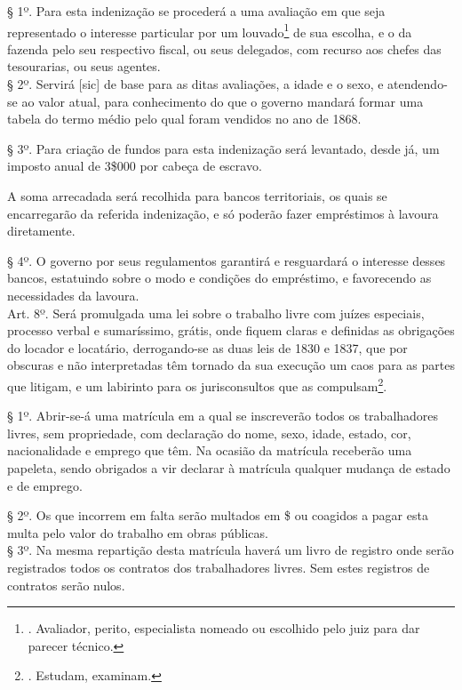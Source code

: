 § 1º. Para esta indenização se procederá a uma avaliação em que seja
representado o interesse particular por um louvado\footnote{. Avaliador,
  perito, especialista nomeado ou escolhido pelo juiz para dar parecer
  técnico.} de sua escolha, e o da fazenda pelo seu respectivo fiscal,
ou seus delegados, com recurso aos chefes das tesourarias, ou seus
agentes.\\
§ 2º. Servirá {[}sic{]} de base para as ditas avaliações, a idade e o
sexo, e atendendo-se ao valor atual, para conhecimento do que o governo
mandará formar uma tabela do termo médio pelo qual foram vendidos no ano
de 1868.

§ 3º. Para criação de fundos para esta indenização será levantado, desde
já, um imposto anual de 3\$000 por cabeça de escravo.

A soma arrecadada será recolhida para bancos territoriais, os quais se
encarregarão da referida indenização, e só poderão fazer empréstimos à
lavoura diretamente.

§ 4º. O governo por seus regulamentos garantirá e resguardará o
interesse desses bancos, estatuindo sobre o modo e condições do
empréstimo, e favorecendo as necessidades da lavoura.\\
Art. 8º. Será promulgada uma lei sobre o trabalho livre com juízes
especiais, processo verbal e sumaríssimo, grátis, onde fiquem claras e
definidas as obrigações do locador e locatário, derrogando-se as duas
leis de 1830 e 1837, que por obscuras e não interpretadas têm tornado da
sua execução um caos para as partes que litigam, e um labirinto para os
jurisconsultos que as compulsam\footnote{. Estudam, examinam.}.

§ 1º. Abrir-se-á uma matrícula em a qual se inscreverão todos os
trabalhadores livres, sem propriedade, com declaração do nome, sexo,
idade, estado, cor, nacionalidade e emprego que têm. Na ocasião da
matrícula receberão uma papeleta, sendo obrigados a vir declarar à
matrícula qualquer mudança de estado e de emprego.

§ 2º. Os que incorrem em falta serão multados em \$ ou coagidos a pagar
esta multa pelo valor do trabalho em obras públicas.\\
§ 3º. Na mesma repartição desta matrícula haverá um livro de registro
onde serão registrados todos os contratos dos trabalhadores livres. Sem
estes registros de contratos serão nulos.

